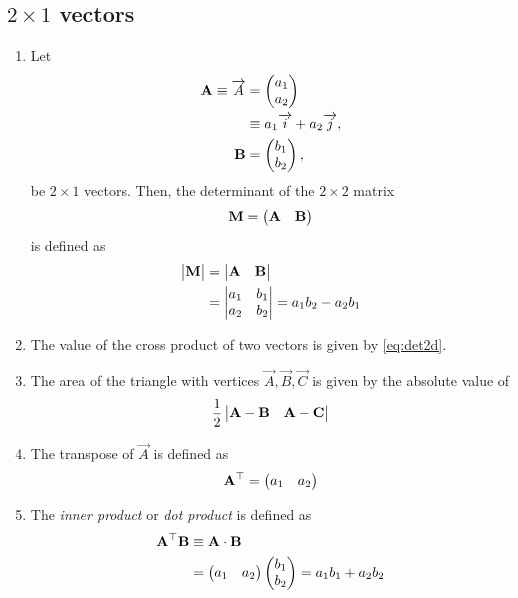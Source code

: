 \documentclass[journal,12pt,twocolumn]{IEEEtran}
\renewcommand\thesection{\arabic{section}}
\renewcommand\thesubsection{\thesection.\arabic{subsection}}
\begin{document}
\subsection{$2\times 1$ vectors}
\renewcommand{\theequation}{\theenumi}
\begin{enumerate}[label=\thesubsection.\arabic*.,ref=\thesubsection.\theenumi]
\item Let 
\begin{align}
  \mathbf{A} \equiv \overrightarrow{A} &= \begin{pmatrix}a_1\\a_2\end{pmatrix} 
  \\
  &\equiv a_1\overrightarrow{i}+a_2\overrightarrow{j}, 
  \\
  \mathbf{B} &= \begin{pmatrix}b_1\\b_2\end{pmatrix}, 
\end{align}
be $2 \times 1$ vectors.
Then, the determinant of the $2 \times 2$ matrix 
\begin{align}  
  \mathbf{M} = \begin{pmatrix}\mathbf{A} & \mathbf{B}\end{pmatrix}
\end{align}
is defined as
\begin{align}
  \label{eq:det2d}
  \begin{vmatrix}\mathbf{M}\end{vmatrix} &= \begin{vmatrix}\mathbf{A} & \mathbf{B}\end{vmatrix} 
  \\
  &= \begin{vmatrix}a_1 & b_1\\a_2 & b_2\end{vmatrix} = a_1b_2 - a_2 b_1
\end{align}
%
\item The value of the cross product of two vectors is given by  
  \eqref{eq:det2d}.
\item The area of the triangle with vertices $\vec{A}, \vec{B}, \vec{C}$ is given by the absolute value of 
\begin{align}
  \label{eq:area2d}
\frac{1}{2} \begin{vmatrix}\mathbf{A-B} & \mathbf{A-C}\end{vmatrix}
  \end{align}
  \item  The transpose of $\vec{A}$ is defined as
\begin{align}
  \label{eq:transpose2d}
  \mathbf{A}^{\top}  = \begin{pmatrix}a_1 & a_2\end{pmatrix}
\end{align}
%
\item The {\em inner product} or {\em dot product} is defined as
\begin{align}
  \label{eq:dot2d}
  \mathbf{A}^{\top} \mathbf{B} &\equiv \mathbf{A} \cdot \mathbf{B} 
  \\
  &= \begin{pmatrix}a_1 & a_2\end{pmatrix} \begin{pmatrix}b_1 \\ b_2\end{pmatrix}= a_1b_1+a_2b_2 
\end{align}

\end{enumerate}
\end{document}

